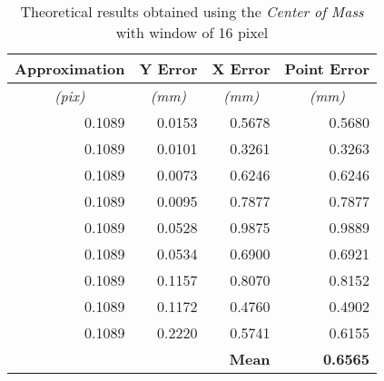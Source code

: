 \begin{table}[b!]
\centering
\begin{tabular}{|r|r|r|r|}
\hline
\multicolumn{1}{|c|}{\textbf{Approximation}} & \multicolumn{1}{c|}{\textbf{Y Error}} & \multicolumn{1}{c|}{\textbf{X Error}} & \multicolumn{1}{c|}{\textbf{Point Error}} \\ \hline
\multicolumn{1}{|c|}{\textit{(pix)}}           & \multicolumn{1}{c|}{\textit{(mm)}}      & \multicolumn{1}{c|}{\textit{(mm)}}      & \multicolumn{1}{c|}{\textit{(mm)}}          \\ \hline
0.1089                                       & 0.0153                                & 0.5678                                & 0.5680                                    \\ \hline
0.1089                                       & 0.0101                                & 0.3261                                & 0.3263                                    \\ \hline
0.1089                                       & 0.0073                                & 0.6246                                & 0.6246                                    \\ \hline
0.1089                                       & 0.0095                                & 0.7877                                & 0.7877                                    \\ \hline
0.1089                                       & 0.0528                                & 0.9875                                & 0.9889                                    \\ \hline
0.1089                                       & 0.0534                                & 0.6900                                & 0.6921                                    \\ \hline
0.1089                                       & 0.1157                                & 0.8070                                & 0.8152                                    \\ \hline
0.1089                                       & 0.1172                                & 0.4760                                & 0.4902                                    \\ \hline
0.1089                                       & 0.2220                                & 0.5741                                & 0.6155                                    \\ \hline
\multicolumn{3}{|r|}{\textbf{Mean}}                                                                                          & \textbf{0.6565}                           \\ \hline
\end{tabular}
\caption{Theoretical results obtained using the \textit{Center of Mass} with window of 16 pixel}
\label{tab:c5-r1-teo}
\end{table}